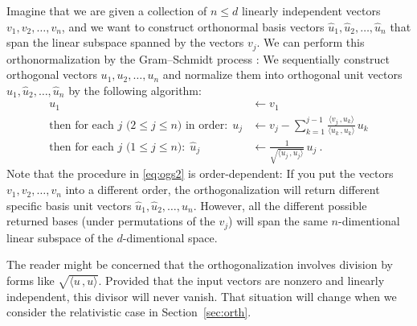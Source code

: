 \documentclass{article}
\newcommand{\inner}[2]{\langle{#1}\,,{#2}\rangle}
\newcommand{\secref}[1]{Section~\ref{#1}}
\begin{document}
Imagine that we are given a collection of $n\leq d$ linearly independent vectors $v_1,v_2,\ldots,v_n$,
and we want to construct orthonormal basis vectors $\hat{u}_1,\hat{u}_2,\ldots,\hat{u}_n$ that span the linear subspace spanned by the vectors $v_j$.
We can perform this orthonormalization by the Gram--Schmidt process \cite{gramschmidt}:
We sequentially construct orthogonal vectors $u_1,u_2,\ldots,u_n$ and normalize them into orthogonal unit vectors $\hat{u}_1,\hat{u}_2,\ldots,\hat{u}_n$ by the following algorithm:
\begin{align}
    u_1 &\leftarrow v_1 \label{eq:ogs1}
    \\
    \mbox{then for each $j$ ($2\leq j\leq n$) in order:} ~~ u_j &\leftarrow v_j - \sum_{k=1}^{j-1} \frac{\inner{v_j}{u_k}}{\inner{u_k}{u_k}}\,u_k \label{eq:ogs2}
    \\
    \mbox{then for each $j$ ($1\leq j\leq n$):} ~~ \hat{u}_j &\leftarrow \frac{1}{\sqrt{\inner{u_j}{u_j}}}\,u_j ~. \label{eq:ogs3}
\end{align}
Note that the procedure in \eqref{eq:ogs2} is order-dependent: If you put the vectors $v_1,v_2,\ldots,v_n$ into a different order, the orthogonalization will return different specific basis unit vectors $\hat{u}_1,\hat{u}_2,\ldots,\hat{u}_n$.
However, all the different possible returned bases (under permutations of the $v_j$) will span the same $n$-dimentional linear subspace of the $d$-dimentional space.

The reader might be concerned that the orthogonalization involves division by forms like $\sqrt{\inner{u}{u}}$.
Provided that the input vectors are nonzero and linearly independent, this divisor will never vanish.
That situation will change when we consider the relativistic case in \secref{sec:orth}.
\end{document}
